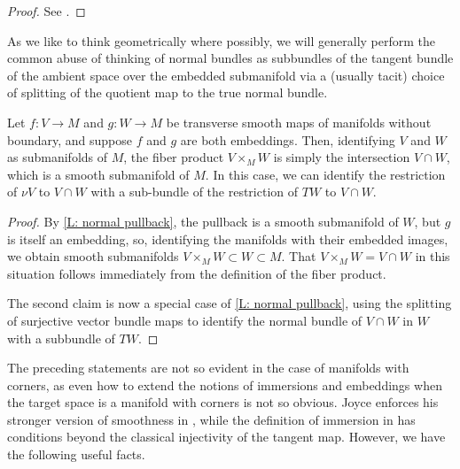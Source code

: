 \begin{proof}
	See \cite[Proposition IV.1.4]{Kos93}.
\end{proof}

As we like to think geometrically where possibly, we will generally perform the common abuse of thinking of normal bundles as subbundles of the tangent bundle of the ambient space over the embedded submanifold via a (usually tacit) choice of splitting of the quotient map to the true normal bundle. 


\begin{lemma}\label{L: fiber product of embeddings}
	Let $f \colon V \to M$ and $g \colon W \to M$ be transverse smooth maps of manifolds without boundary, and suppose $f$ and $g$ are both embeddings.
	Then, identifying $V$ and $W$ as submanifolds of $M$, the fiber product $V \times_MW$ is simply the intersection $V \cap W$, which is a smooth submanifold of $M$.
	In this case, we can identify the restriction of $\nu V$ to $V \cap W$ with a sub-bundle of the restriction of $TW$ to $V \cap W$.
\end{lemma}

\begin{proof}
	By \cref{L: normal pullback}, the pullback is a smooth submanifold of $W$, but $g$ is itself an embedding, so, identifying the manifolds with their embedded images, we obtain smooth submanifolds $V \times_MW \subset W \subset M$.
	That $V \times_MW = V \cap W$ in this situation follows immediately from the definition of the fiber product.

	The second claim is now a special case of \cref{L: normal pullback}, using the splitting of surjective vector bundle maps \cite[Theorem 3.9.6]{Hus75} to identify the normal bundle of $V \cap W$ in $W$ with a subbundle of $TW$. 
\end{proof}

The preceding statements are not so evident in the case of manifolds with corners, as even how to extend the notions of immersions and embeddings when the target space is a manifold with corners is not so obvious. Joyce enforces his stronger version of smoothness in \cite{Joy12}, while the definition of immersion in \cite[Section 3.2]{MaDo92} has conditions beyond the classical injectivity of the tangent map. However, we have the following useful facts.

